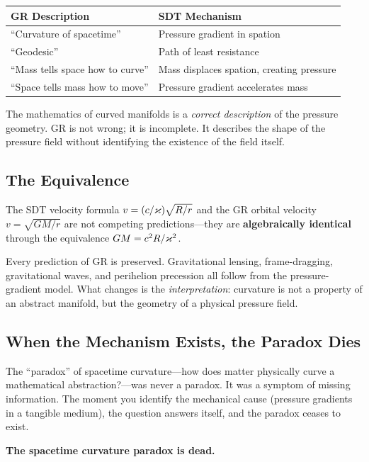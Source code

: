 \begin{center}
\begin{tabular}{ll}
\toprule
\textbf{GR Description} & \textbf{SDT Mechanism} \\
\midrule
``Curvature of spacetime'' & Pressure gradient in spation \\
``Geodesic'' & Path of least resistance \\
``Mass tells space how to curve'' & Mass displaces spation, creating pressure \\
``Space tells mass how to move'' & Pressure gradient accelerates mass \\
\bottomrule
\end{tabular}
\end{center}

The mathematics of curved manifolds is a \emph{correct description} of the pressure geometry. GR is not wrong; it is incomplete. It describes the shape of the pressure field without identifying the existence of the field itself.

\subsection{The Equivalence}

The SDT velocity formula $v = (c/\varkappa)\sqrt{R/r}$ and the GR orbital velocity $v = \sqrt{GM/r}$ are not competing predictions---they are \textbf{algebraically identical} through the equivalence $GM = c^2 R/\varkappa^2$.

Every prediction of GR is preserved. Gravitational lensing, frame-dragging, gravitational waves, and perihelion precession all follow from the pressure-gradient model. What changes is the \emph{interpretation}: curvature is not a property of an abstract manifold, but the geometry of a physical pressure field.

\subsection{When the Mechanism Exists, the Paradox Dies}

The ``paradox'' of spacetime curvature---how does matter physically curve a mathematical abstraction?---was never a paradox. It was a symptom of missing information. The moment you identify the mechanical cause (pressure gradients in a tangible medium), the question answers itself, and the paradox ceases to exist.

\textbf{The spacetime curvature paradox is dead.}
